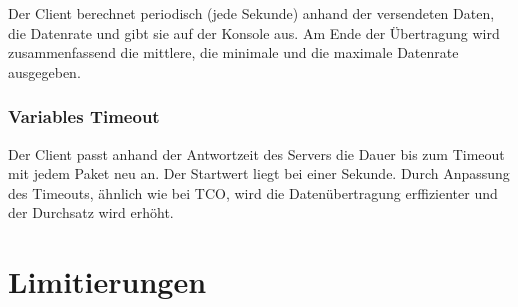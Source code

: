 \documentclass{article}
\begin{document}
			Der Client berechnet periodisch (jede Sekunde) anhand der versendeten Daten, die Datenrate und gibt sie auf der Konsole aus. Am Ende der Übertragung wird zusammenfassend die mittlere, die minimale und die maximale Datenrate ausgegeben.

			\subsubsection{Variables Timeout}

			Der Client passt anhand der Antwortzeit des Servers die Dauer bis zum Timeout mit jedem Paket neu an. Der Startwert liegt bei einer Sekunde. Durch Anpassung des Timeouts, ähnlich wie bei TCO, wird die Datenübertragung erffizienter und der Durchsatz wird erhöht.

	\section{Limitierungen}
\end{document}

